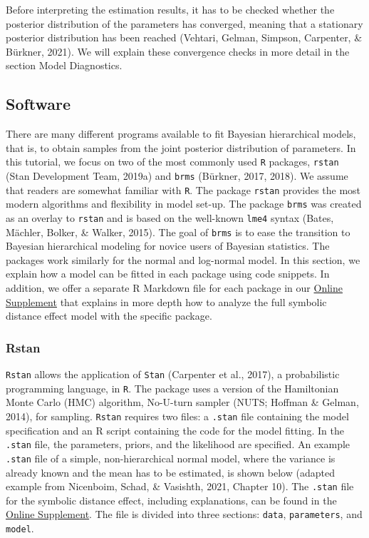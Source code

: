 \documentclass[
  english,
  doc,floatsintext]{apa6}
\begin{document}
Before interpreting the estimation results, it has to be checked whether the posterior distribution of the parameters has converged, meaning that a stationary posterior distribution has been reached (Vehtari, Gelman, Simpson, Carpenter, \& Bürkner, 2021). We will explain these convergence checks in more detail in the section Model Diagnostics.

\hypertarget{software}{%
\subsection{Software}\label{software}}

There are many different programs available to fit Bayesian hierarchical models, that is, to obtain samples from the joint posterior distribution of parameters. In this tutorial, we focus on two of the most commonly used \texttt{R} packages, \texttt{rstan} (Stan Development Team, 2019a) and \texttt{brms} (Bürkner, 2017, 2018). We assume that readers are somewhat familiar with \texttt{R}. The package \texttt{rstan} provides the most modern algorithms and flexibility in model set-up. The package \texttt{brms} was created as an overlay to \texttt{rstan} and is based on the well-known \texttt{lme4} syntax (Bates, Mächler, Bolker, \& Walker, 2015). The goal of \texttt{brms} is to ease the transition to Bayesian hierarchical modeling for novice users of Bayesian statistics. The packages work similarly for the normal and log-normal model. In this section, we explain how a model can be fitted in each package using code snippets. In addition, we offer a separate R Markdown file for each package in our \href{https://github.com/MyrtheV/Bayesian-Hierarchical-Modelling-An-Introduction-and-Reassessment}{Online Supplement} that explains in more depth how to analyze the full symbolic distance effect model with the specific package.

\hypertarget{rstan}{%
\subsubsection{Rstan}\label{rstan}}

\texttt{Rstan} allows the application of \texttt{Stan} (Carpenter et al., 2017), a probabilistic programming language, in \texttt{R}. The package uses a version of the Hamiltonian Monte Carlo (HMC) algorithm, No-U-turn sampler (NUTS; Hoffman \& Gelman, 2014), for sampling. \texttt{Rstan} requires two files: a \texttt{.stan} file containing the model specification and an R script containing the code for the model fitting. In the \texttt{.stan} file, the parameters, priors, and the likelihood are specified. An example \texttt{.stan} file of a simple, non-hierarchical normal model, where the variance is already known and the mean has to be estimated, is shown below (adapted example from Nicenboim, Schad, \& Vasishth, 2021, Chapter 10). The \texttt{.stan} file for the symbolic distance effect, including explanations, can be found in the \href{https://github.com/MyrtheV/Bayesian-Hierarchical-Modelling-An-Introduction-and-Reassessment/blob/main/R\%20objects/rstan/normal\%20model/myModel.stan}{Online Supplement}. The file is divided into three sections: \texttt{data}, \texttt{parameters}, and \texttt{model}.
\end{document}
